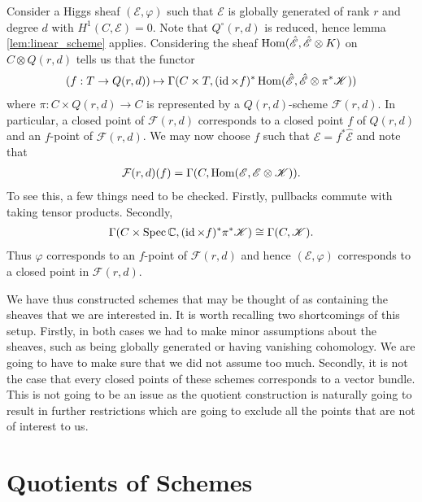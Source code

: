 \documentclass[12pt]{ociamthesis}  %
\begin{document}
\begin{example}\label{ex:quot_scheme_of_higgs}
  Consider a Higgs sheaf $(\mathscr E,\varphi)$ such that $\mathscr E$ is globally generated of
  rank $r$ and degree $d$ with $H^1(C,\mathscr E)=0$.
  Note that $Q^\circ(r,d)$ is reduced, hence lemma \ref{lem:linear_scheme}
  applies.
  Considering the sheaf $\operatorname{Hom}(\hat{\mathscr E},\hat{\mathscr E}\otimes K)$ on
  $C\otimes Q(r,d)$ tells us that the functor
  \begin{align*}
    (f:T\to Q(r,d))
    \mapsto
    \Gamma(C\times T,(\operatorname{id}\times f)^*\operatorname{Hom}(\hat{\mathscr E},\hat{\mathscr E}\otimes\pi^*\mathscr K))
  \end{align*}
  where $\pi : C\times Q(r,d)\to C$ is represented by a
  $Q(r,d)$-scheme $\mathcal F(r,d)$.
  In particular, a closed point of $\mathcal F(r,d)$ corresponds to a
  closed point $f$ of $Q(r,d)$ and an $f$-point of $\mathcal F(r,d)$.
  We may now choose $f$ such that $\mathscr E = f^*\hat{\mathscr E}$ and note
  that
  \begin{align*}
    \mathcal F(r,d)(f) = \Gamma(C,\operatorname{Hom}(\mathscr E,\mathscr E\otimes\mathscr K)).
  \end{align*}
  To see this, a few things need to be checked. Firstly, pullbacks
  commute with taking tensor products. Secondly,
  \begin{align*}
    \Gamma(C\times\operatorname{Spec}\mathbb C,(\operatorname{id}\times f)^*\pi^*\mathscr K)
    \cong \Gamma(C,\mathscr K).
  \end{align*}
  Thus $\varphi$ corresponds to an $f$-point of $\mathcal F(r,d)$
  and hence $(\mathscr E,\varphi)$ corresponds to a closed point in
  $\mathcal F(r,d)$. 
\end{example}

We have thus constructed schemes that may be thought of as containing
the sheaves that we are interested in. It is worth recalling two
shortcomings of this setup. Firstly, in both cases we had to make
minor assumptions about the sheaves, such as being globally generated
or having vanishing cohomology. We are going to have to make sure that
we did not assume too much. Secondly, it is not the case that every
closed points of these schemes corresponds to a vector bundle. This is
not going to be an issue as the quotient construction is naturally
going to result in further restrictions which are going to exclude
all the points that are not of interest to us.

\section{Quotients of Schemes}
\end{document}
